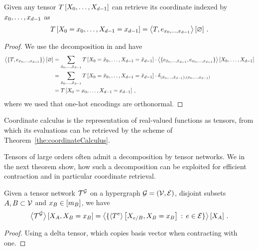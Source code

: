 \begin{theorem}
    \label{the:coordinateCalculus}
    Given any tensor $T\left[X_{0},\ldots,X_{d-1}\right]$ can retrieve its coordinate indexed by $x_{0},\ldots,x_{d-1}$ as
    \[ T\left[X_{0}=x_{0},\ldots,X_{d-1}=x_{d-1}\right] = \left\langle T, e_{x_{0},\ldots,x_{d-1}}\right\rangle \left[ \varnothing \right] \, . \]
\end{theorem}
\begin{proof}
    We use the decomposition in  and have
    \begin{align*}
        \left\langle \{T, e_{x_{0},\ldots,x_{d-1}}\}\right\rangle \left[ \varnothing \right]
        & = \sum_{\tilde{x}_{0},\ldots,\tilde{x}_{d-1}} T\left[X_{0}=\tilde{x}_0,\ldots,X_{d-1}=\tilde{x}_{d-1}\right] \cdot \left\langle \{e_{\tilde{x}_{0},\ldots,\tilde{x}_{d-1}} ,e_{x_{0},\ldots,x_{d-1}} \}\right\rangle \left[ X_{0},\ldots,X_{d-1} \right] \\
        & =  \sum_{\tilde{x}_{0},\ldots,\tilde{x}_{d-1}} T\left[X_{0}=\tilde{x}_0,\ldots,X_{d-1}=\tilde{x}_{d-1}\right] \cdot \delta_{(\tilde{x}_{0},\ldots,\tilde{x}_{d-1}),(x_{0},\ldots,x_{d-1})} \\
        & = T\left[X_{0}=x_{0},\ldots,X_{d-1}=x_{d-1}\right] \, ,
    \end{align*}
    where we used that one-hot encodings are orthonormal.
\end{proof}

Coordinate calculus is the representation of real-valued functions as tensors, from which its evaluations can be retrieved by the scheme of Theorem~\ref{the:coordinateCalculus}.




Tensors of large orders often admit a decomposition by tensor networks.
We in the next theorem show, how such a decomposition can be exploited for efficient contraction and in particular coordinate retrieval.


\begin{theorem}
    \label{the:slicedContractionToCores}
    Given a tensor network $\mathcal{T}^{\mathcal{G}}$ on a hypergraph $\mathcal{G}=(\mathcal{V},\mathcal{E})$, disjoint subsets $A,B\subset\mathcal{V}$ and $x_{B}\in[m_{B}]$, we have
    \[ \left\langle \mathcal{T}^{\mathcal{G}}\right\rangle \left[ X_{A},X_{B}=x_{B} \right]
    =  \left\langle \{
    \left\langle T^{e}\right\rangle \left[ X_{e/B},X_{B}=x_{B} \right] \, : \, e\in\mathcal{E}
    \}\right\rangle \left[ X_{A} \right] \, .
    \]
\end{theorem}
\begin{proof}
    Using a delta tensor, which copies basis vector when contracting with one.
\end{proof}

